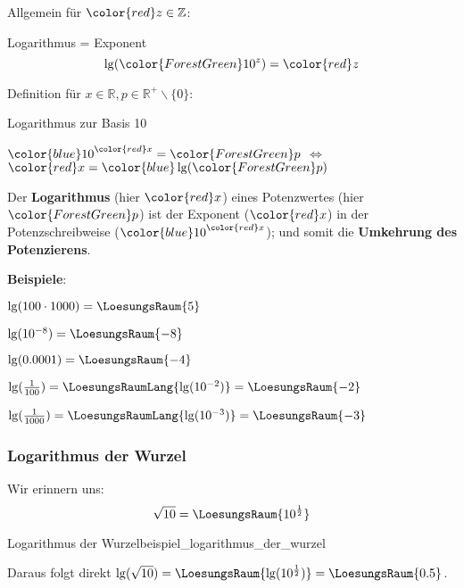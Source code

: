 \vspace{5mm}

Allgemein für ${\color{red}z}\in \mathbb{Z}$:

\begin{gesetz}{Logarithmus = Exponent}{}
  $$\lg({\color{ForestGreen} 10^z}) = {\color{red} z}$$
\end{gesetz}


Definition für $x\in\mathbb{R}, p \in \mathbb{R}^{+}\backslash\{0\}$:
\begin{definition}{Logarithmus zur Basis 10}{}
  \begin{center}
    ${\color{blue}10}^{\color{red}x}={\color{ForestGreen}p}$
    $\Longleftrightarrow$
    ${\color{red}x} = {\color{blue}\lg}({\color{ForestGreen}p})$
    \end{center}
\end{definition}

\begin{bemerkung}{}{}
  Der \textbf{Logarithmus} (hier $\color{red}x$) eines Potenzwertes
  (hier $\color{ForestGreen}p$) ist der Exponent ($\color{red}x$) in der
  Potenzschreibweise (${\color{blue}10}^{\color{red}x}$); und somit die \textbf{Umkehrung des Potenzierens}.
\end{bemerkung}

\textbf{Beispiele}:\\
\leserluft{}

$\lg(100 \cdot{} 1000) = \LoesungsRaum{5}$
\leserluft{}

$\lg(10^{-8}) = \LoesungsRaum{-8}$
\leserluft{}

$\lg(0.0001) = \LoesungsRaum{-4}$

$\lg(\frac1{100}) =\LoesungsRaumLang{\lg(10^{-2}) } = \LoesungsRaum{-2}$
\leserluft{}

$\lg(\frac1{1000}) =\LoesungsRaumLang{\lg(10^{-3}) } = \LoesungsRaum{-3}$

\newpage
\subsubsection{Logarithmus der Wurzel}
Wir erinnern uns: $$\sqrt{10} =\LoesungsRaum{ 10^\frac12}$$
\begin{beispiel}{Logarithmus der
    Wurzel}{beispiel_logarithmus_der_wurzel}

  Daraus folgt direkt $\lg(\sqrt{10}) = \LoesungsRaum{\lg(10^\frac12)}  = \LoesungsRaum{0.5}$.
\end{beispiel}

